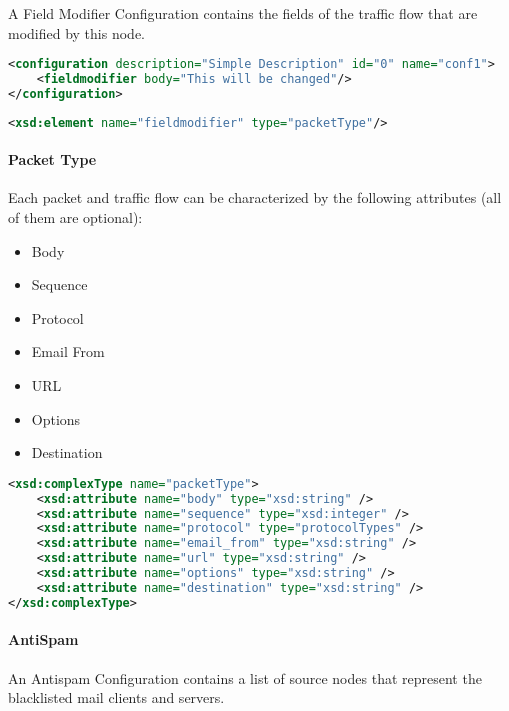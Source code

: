 A Field Modifier Configuration contains the fields of the traffic flow that are modified by this node.

\begin{lstlisting}[language=XML, caption=FieldModifier Configuration Example]
<configuration description="Simple Description" id="0" name="conf1">
    <fieldmodifier body="This will be changed"/>
</configuration>
\end{lstlisting}

\begin{lstlisting}[language=XML, caption=Fieldmodifier schema code snippet]
<xsd:element name="fieldmodifier" type="packetType"/>
\end{lstlisting}

\paragraph{Packet Type}

Each packet and traffic flow can be characterized by the following attributes (all of them are optional):
\begin{itemize}
 \item Body
 \item Sequence
 \item Protocol
 \item Email From
 \item URL
 \item Options
 \item Destination
\end{itemize}
\begin{lstlisting}[language=XML, caption=PacketType schema code snippet]
<xsd:complexType name="packetType">
    <xsd:attribute name="body" type="xsd:string" />
    <xsd:attribute name="sequence" type="xsd:integer" />
    <xsd:attribute name="protocol" type="protocolTypes" />
    <xsd:attribute name="email_from" type="xsd:string" />
    <xsd:attribute name="url" type="xsd:string" />
    <xsd:attribute name="options" type="xsd:string" />
	<xsd:attribute name="destination" type="xsd:string" />
</xsd:complexType>
\end{lstlisting}

\paragraph{AntiSpam}

An Antispam Configuration contains a list of source nodes that represent the blacklisted mail clients and servers.

